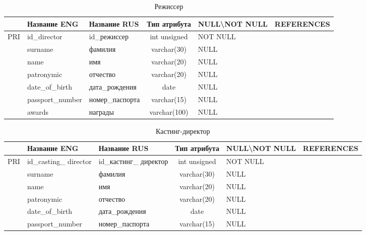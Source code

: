 \documentclass[11pt,a4paper,final]{article} %
\begin{document}
\begin{table}[H]
	\centering
	\begin{tabular}{|c|p{2.8cm}|p{2.8cm}|c|p{2cm}|p{2.5cm}|}
		\hline
		& Название ENG & Название RUS & Тип атрибута & NULL\textbackslash \newline NOT NULL & REFERENCES \\
		\hline
		PRI & id\_director & id\_режиссер & int unsigned & NOT NULL &  \\
		\hline
		& surname & фамилия & varchar(30) & NULL & \\
		\hline
		& name & имя & varchar(20) & NULL &  \\
		\hline
		& patronymic & отчество & varchar(20) & NULL &  \\
		\hline
		& date\_of\_birth & дата\_рождения & date & NULL &  \\
		\hline
		& passport\_number & номер\_паспорта & varchar(15) & NULL &  \\
		\hline
		& awards & награды & varchar(100) & NULL & \\
		\hline
	\end{tabular}
	\caption{Режиссер}
	\label{tab:director}
\end{table}

\vspace{-\baselineskip}

\begin{table}[H]
	\centering
	\begin{tabular}{|c|p{2.8cm}|p{2.8cm}|c|p{2cm}|p{2.5cm}|}
		\hline
		& Название ENG & Название RUS & Тип атрибута & NULL\textbackslash \newline NOT NULL & REFERENCES \\
		\hline
		PRI & id\_casting\_ \newline director & id\_кастинг\_ \newline директор & int unsigned & NOT NULL &  \\
		\hline
		& surname & фамилия & varchar(30) & NULL & \\
		\hline
		& name & имя & varchar(20) & NULL &  \\
		\hline
		& patronymic & отчество & varchar(20) & NULL &  \\
		\hline
		& date\_of\_birth & дата\_рождения & date & NULL &  \\
		\hline
		& passport\_number & номер\_паспорта & varchar(15) & NULL &  \\
		\hline
	\end{tabular}
	\caption{Кастинг-директор}
	\label{tab:cdirector}
\end{table}
\end{document}
